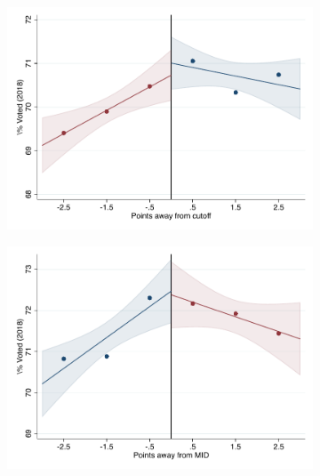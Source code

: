 \documentclass[oneside,11pt]{article}
\begin{document}
\begin{figure}[H]
\begin{center}
    \begin{subfigure}{0.475\textwidth}
        \centering
        \includegraphics[width=\textwidth]{04_Figures/rd_plot_tau_Voto_Marcado_2018_UNAM3.pdf}
    \end{subfigure}
    \begin{subfigure}{0.475\textwidth}
        \centering
        \includegraphics[width=\textwidth]{04_Figures/rd_plot_mid_Voto_Marcado_2018_UNAM3.pdf}
    \end{subfigure}


\end{center}
\end{figure}
\end{document}
